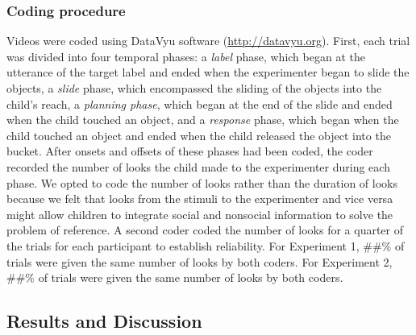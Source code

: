 \documentclass[10pt, letterpaper]{article}
\begin{document}
\subsubsection{Coding procedure}\label{coding-procedure}

Videos were coded using DataVyu software (\url{http://datavyu.org}).
First, each trial was divided into four temporal phases: a \emph{label}
phase, which began at the utterance of the target label and ended when
the experimenter began to slide the objects, a \emph{slide} phase, which
encompassed the sliding of the objects into the child's reach, a
\emph{planning phase}, which began at the end of the slide and ended
when the child touched an object, and a \emph{response} phase, which
began when the child touched an object and ended when the child released
the object into the bucket. After onsets and offsets of these phases had
been coded, the coder recorded the number of looks the child made to the
experimenter during each phase. We opted to code the number of looks
rather than the duration of looks because we felt that looks from the
stimuli to the experimenter and vice versa might allow children to
integrate social and nonsocial information to solve the problem of
reference. A second coder coded the number of looks for a quarter of the
trials for each participant to establish reliability. For Experiment 1,
\#\#\% of trials were given the same number of looks by both coders. For
Experiment 2, \#\#\% of trials were given the same number of looks by
both coders.

\subsection{Results and Discussion}\label{results-and-discussion}
\end{document}
